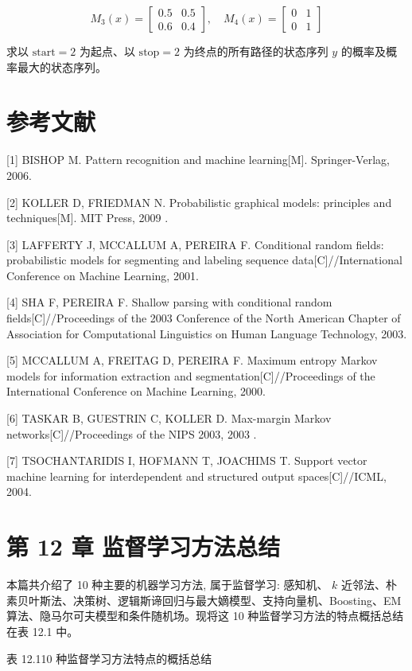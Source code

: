 \documentclass[10pt]{article}
\begin{document}
\begin{CJK*}{UTF8}{bsmi}
$$
M_{3}(x)=\left[\begin{array}{ll}
0.5 & 0.5 \\
0.6 & 0.4
\end{array}\right], \quad M_{4}(x)=\left[\begin{array}{ll}
0 & 1 \\
0 & 1
\end{array}\right]
$$

求以 $\mathrm{start}=2$ 为起点、以 $\mathrm{stop}=2$ 为终点的所有路径的状态序列 $y$ 的概率及概率最大的状态序列。

\section*{参考文献}
[1] BISHOP M. Pattern recognition and machine learning[M]. Springer-Verlag, 2006.

[2] KOLLER D, FRIEDMAN N. Probabilistic graphical models: principles and techniques[M]. MIT Press, 2009 .

[3] LAFFERTY J, MCCALLUM A, PEREIRA F. Conditional random fields: probabilistic models for segmenting and labeling sequence data[C]//International Conference on Machine Learning, 2001.

[4] SHA F, PEREIRA F. Shallow parsing with conditional random fields[C]//Proceedings of the 2003 Conference of the North American Chapter of Association for Computational Linguistics on Human Language Technology, 2003.

[5] MCCALLUM A, FREITAG D, PEREIRA F. Maximum entropy Markov models for information extraction and segmentation[C]//Proceedings of the International Conference on Machine Learning, 2000.

[6] TASKAR B, GUESTRIN C, KOLLER D. Max-margin Markov networks[C]//Proceedings of the NIPS 2003, 2003 .

[7] TSOCHANTARIDIS I, HOFMANN T, JOACHIMS T. Support vector machine learning for interdependent and structured output spaces[C]//ICML, 2004.

\section*{第 12 章 监督学习方法总结}
本篇共介绍了 10 种主要的机器学习方法, 属于监督学习: 感知机、 $k$ 近邻法、朴素贝叶斯法、决策树、逻辑斯谛回归与最大嫡模型、支持向量机、Boosting、EM 算法、隐马尔可夫模型和条件随机场。现将这 10 种监督学习方法的特点概括总结在表 12.1 中。

表 12.110 种监督学习方法特点的概括总结


\end{CJK*}
\end{document}
